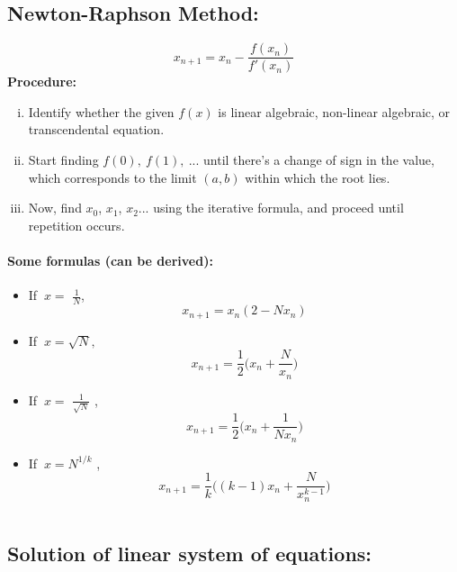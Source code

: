 \documentclass{article}
\begin{document}
{\subsection{\LARGE Newton-Raphson Method:}
{\LARGE $$x_{n+1}=x_n-\frac{f(x_n)}{f'(x_n)}$$}
\textbf{Procedure:}
\begin{enumerate}[(i)]
\item Identify whether the given {\LARGE $f(x)$} is linear algebraic, non-linear algebraic, or transcendental equation.
\item Start finding $f(0),\ f(1),\ ...$ until there's a change of sign in the value, which corresponds to the limit $(a,b)$ within which the root lies.
\item Now, find $x_0$, $x_1$, $x_2$... using the iterative formula, and proceed until repetition occurs.
\end{enumerate}
\paragraph{\Large Some formulas (can be derived):}
\begin{itemize}
\item If {\LARGE $\ x=$} {\huge $\frac{1}N$},
{\LARGE $$x_{n+1}=x_n(2-Nx_n)$$}
\item If {\LARGE $\ x=\sqrt{N},$}
{\LARGE $$x_{n+1}=\frac{1}2\bigg(x_n+\frac{N}{x_n}\bigg)$$}
\item If {\LARGE $\ x=$} {\huge $\frac{1}{\sqrt{N}}$} ,
{\LARGE $$x_{n+1}=\frac{1}2\bigg(x_n+\frac{1}{Nx_n}\bigg)$$}
\item If {\LARGE $\ x=N^{1/k}$} ,
{\LARGE $$x_{n+1}=\frac{1}k\bigg((k-1)x_n+\frac{N}{x_n^{k-1}}\bigg)$$}
\end{itemize}
$\ $
\subsection{\LARGE Solution of linear system of equations:}
$\ $
\begin{center}
\end{center}
}
\end{document}
